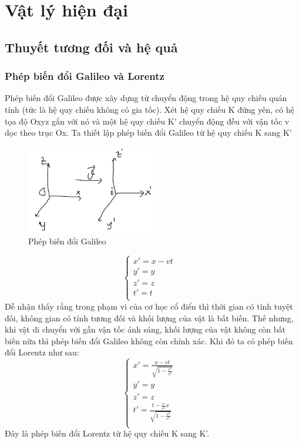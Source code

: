 \chapter{Vật lý hiện đại}
\section{Thuyết tương đối và hệ quả}
\subsection{Phép biến đổi Galileo và Lorentz}
Phép biến đổi Galileo được xây dựng từ chuyển động trong hệ quy chiếu quán tính (tức là hệ quy chiếu không có gia tốc). 
Xét hệ quy chiếu K đứng yên, có hệ tọa độ Oxyz gắn với nó và một hệ quy chiếu K' chuyển động đều với vận tốc v dọc theo trục Ox. Ta thiết lập phép biến đổi Galileo từ hệ quy chiếu K sang K'
\begin{figure}
    \centering
    \includegraphics[width=0.5\textwidth]{galileo.png}
    \caption{Phép biến đổi Galileo}
    \label{galileo}
\end{figure}
$$\left\{\begin{array}{ll}
    x'=x-vt     &  \\
    y'=y     &\\
    z'=z & \\
    t'=t & \\
    \end{array}\right.$$
Dễ nhận thấy rằng trong phạm vi của cơ học cổ điển thì thời gian có tính tuyệt đối, không gian có tính tương đối và khối lượng của vật là bất biến. Thế nhưng, khi 
vật di chuyển với gần vận tốc ánh sáng, khối lượng của vật không còn bất biến nữa thì phép biến đổi Galileo không còn chính xác. Khi đó ta có phép biến đổi Lorentz như sau:
$$\left\{\begin{array}{ll}
    x'=\frac{x-vt}{\sqrt{1-\frac{v^2}{c^2}}}    &  \\
    y'=y     &\\
    z'=z & \\
    t'=\frac{t-\frac{v}{c^2}x}{\sqrt{1-\frac{v^2}{c^2}}} & \\
    \end{array}\right.$$
Đây là phép biến đổi Lorentz từ hệ quy chiếu K sang K'.
